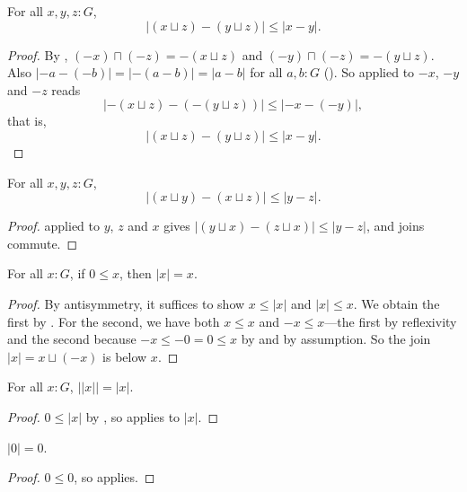 \begin{corollary}
  \label{absDeltaJoinR}
  For all $x, y, z : G$,
  \[
    \lvert (x \sqcup z) - (y \sqcup z) \rvert \le \lvert x - y \rvert.
  \]
\end{corollary}
\begin{proof}
  By , $(-x) \sqcap (-z) = -(x \sqcup z)$ and $(-y) \sqcap (-z) = -(y \sqcup z)$. Also $\lvert -a - (-b) \rvert = \lvert -(a - b) \rvert = \lvert a - b \rvert$ for all $a, b : G$ (). So  applied to $-x$, $-y$ and $-z$ reads
  \[
    \lvert -(x \sqcup z) - (-(y \sqcup z)) \rvert
    \le \lvert -x - (-y) \rvert,
  \]
  that is,
  \[
    \lvert (x \sqcup z) - (y \sqcup z) \rvert \le \lvert x - y \rvert.
  \]
\end{proof}

\begin{corollary}
  \label{absDeltaJoinL}
  For all $x, y, z : G$,
  \[
    \lvert (x \sqcup y) - (x \sqcup z) \rvert \le \lvert y - z \rvert.
  \]
\end{corollary}
\begin{proof}
   applied to $y$, $z$ and $x$ gives $\lvert (y \sqcup x) - (z \sqcup x) \rvert \le \lvert y - z \rvert$, and joins commute.
\end{proof}

\begin{lemma}
  \label{nonNegAbsEqId}
  For all $x : G$, if $0 \le x$, then $\lvert x \rvert = x$.
\end{lemma}
\begin{proof}
  By antisymmetry, it suffices to show $x \le \lvert x \rvert$ and $\lvert x \rvert \le x$. We obtain the first by . For the second, we have both $x \le x$ and $-x \le x$---the first by reflexivity and the second because $-x \le -0 = 0 \le x$ by  and by assumption. So the join $\lvert x \rvert = x \sqcup (-x)$ is below $x$.
\end{proof}

\begin{corollary}
  \label{absAbs}
  For all $x : G$, $\lvert \lvert x \rvert \rvert = \lvert x \rvert$.
\end{corollary}
\begin{proof}
  $0 \le \lvert x \rvert$ by , so  applies to $\lvert x \rvert$.
\end{proof}

\begin{corollary}
  \label{absZero}
  $\lvert 0 \rvert = 0$.
\end{corollary}
\begin{proof}
  $0 \le 0$, so  applies.
\end{proof}

